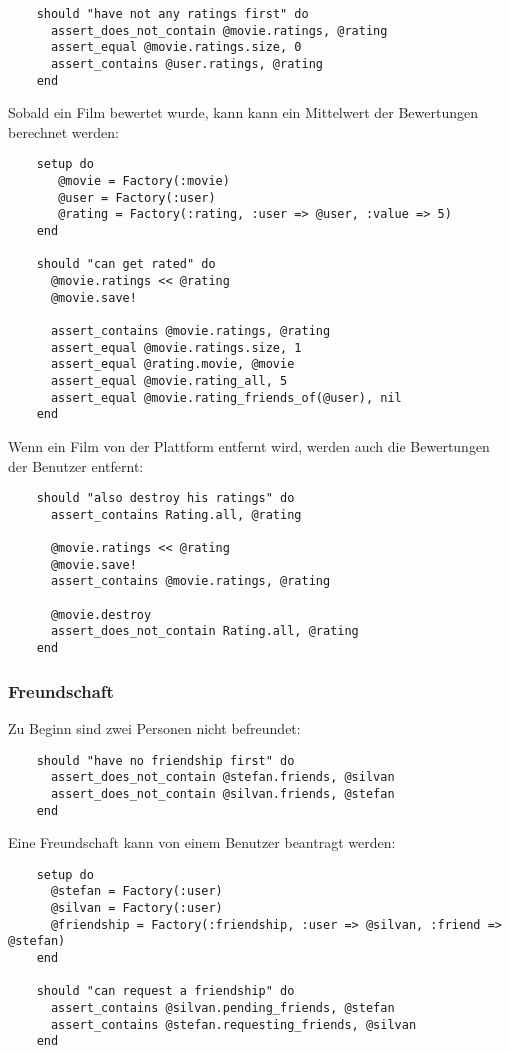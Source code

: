 \begin{verbatim}
    should "have not any ratings first" do
      assert_does_not_contain @movie.ratings, @rating
      assert_equal @movie.ratings.size, 0
      assert_contains @user.ratings, @rating
    end
\end{verbatim}

Sobald ein Film bewertet wurde, kann kann ein Mittelwert der Bewertungen
berechnet werden:

\begin{verbatim}
    setup do
       @movie = Factory(:movie)
       @user = Factory(:user)
       @rating = Factory(:rating, :user => @user, :value => 5)
    end
    
    should "can get rated" do
      @movie.ratings << @rating
      @movie.save!
      
      assert_contains @movie.ratings, @rating
      assert_equal @movie.ratings.size, 1
      assert_equal @rating.movie, @movie
      assert_equal @movie.rating_all, 5
      assert_equal @movie.rating_friends_of(@user), nil
    end
\end{verbatim}

Wenn ein Film von der Plattform entfernt wird, werden auch die Bewertungen
der Benutzer entfernt:

\begin{verbatim}
    should "also destroy his ratings" do
      assert_contains Rating.all, @rating
      
      @movie.ratings << @rating
      @movie.save!
      assert_contains @movie.ratings, @rating
      
      @movie.destroy
      assert_does_not_contain Rating.all, @rating
    end
\end{verbatim}

\subsubsection{Freundschaft}
Zu Beginn sind zwei Personen nicht befreundet:

\begin{verbatim}
    should "have no friendship first" do
      assert_does_not_contain @stefan.friends, @silvan
      assert_does_not_contain @silvan.friends, @stefan
    end
\end{verbatim}

Eine Freundschaft kann von einem Benutzer beantragt werden:

\begin{verbatim}
    setup do
      @stefan = Factory(:user)
      @silvan = Factory(:user)
      @friendship = Factory(:friendship, :user => @silvan, :friend => @stefan)
    end
    
    should "can request a friendship" do
      assert_contains @silvan.pending_friends, @stefan
      assert_contains @stefan.requesting_friends, @silvan
    end
\end{verbatim}

